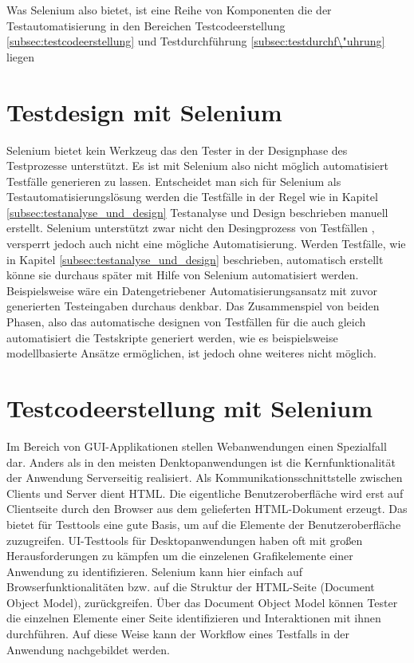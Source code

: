 Was Selenium also bietet, ist eine Reihe von Komponenten die der Testautomatisierung in den Bereichen Testcodeerstellung \ref{subsec:testcodeerstellung} und Testdurchführung \ref{subsec:testdurchf\"uhrung} liegen

\section{Testdesign mit Selenium}
\label{sec:Testdesign}
Selenium bietet kein Werkzeug das den Tester in der Designphase des Testprozesse unterstützt.
Es ist mit Selenium also nicht möglich automatisiert Testfälle generieren zu lassen. Entscheidet man sich für Selenium als Testautomatisierungslösung werden die Testfälle in der Regel wie in Kapitel \ref{subsec:testanalyse_und_design} Testanalyse und Design beschrieben manuell erstellt. Selenium unterstützt zwar nicht den Desingprozess von Testfällen , versperrt jedoch auch nicht eine mögliche Automatisierung. Werden Testfälle, wie in Kapitel \ref{subsec:testanalyse_und_design} beschrieben, automatisch erstellt könne sie durchaus später mit Hilfe von Selenium automatisiert werden. Beispielsweise wäre ein Datengetriebener Automatisierungsansatz mit zuvor generierten Testeingaben durchaus denkbar. Das Zusammenspiel von beiden Phasen, also das automatische designen von Testfällen für die auch gleich automatisiert die Testskripte generiert werden, wie es beispielsweise modellbasierte Ansätze ermöglichen, ist jedoch ohne weiteres nicht möglich.

\section{Testcodeerstellung mit Selenium}
\label{sec:Testdesign}

Im Bereich von GUI-Applikationen stellen Webanwendungen einen Spezialfall dar. Anders als in den meisten Denktopanwendungen ist die Kernfunktionalität der Anwendung Serverseitig realisiert. Als Kommunikationsschnittstelle zwischen Clients und Server dient HTML. Die eigentliche Benutzeroberfläche wird erst auf Clientseite durch den Browser aus dem gelieferten HTML-Dokument erzeugt. Das bietet für Testtools eine gute Basis, um auf die Elemente der Benutzeroberfläche zuzugreifen. \cite[vgl. Seite 59]{seidl_basiswissen_2012} UI-Testtools für Desktopanwendungen haben oft mit großen Herausforderungen zu kämpfen um die einzelenen Grafikelemente einer Anwendung zu identifizieren. Selenium kann hier einfach auf Browserfunktionalitäten bzw. auf die Struktur der HTML-Seite (Document Object Model), zurückgreifen. Über das Document Object Model können Tester die einzelnen Elemente einer Seite identifizieren und Interaktionen mit ihnen durchführen. Auf diese Weise kann der Workflow eines Testfalls in der Anwendung nachgebildet werden.

